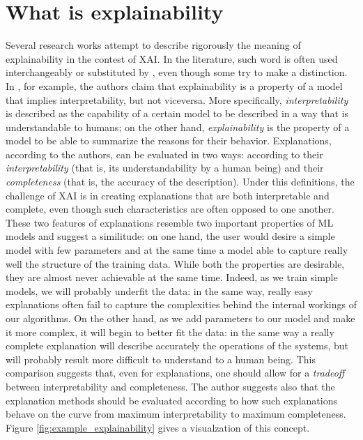 \section{What is explainability}
Several research works attempt to describe rigorously the meaning of explainability in the contest of XAI. In the literature, such word is often used interchangeably or substituted by , even though some try to make a distinction. In \cite{gilpin2018explaining}, for example, the authors claim that explainability is a property of a model that implies interpretability, but not viceversa. More specifically, \textit{interpretability} is described as the capability of a certain model to be described in a  way that is understandable to humans; on the other hand, \textit{explainability} is the property of a model to be able to summarize the reasons for their behavior. Explanations, according to the authors, can be evaluated in two ways: according to their \textit{interpretability} (that is, its understandability by a human being) and their \textit{completeness} (that is, the accuracy of the description). Under this definitions, the challenge of XAI is in creating explanations that are both interpretable and complete, even though such characteristics are often opposed to one another. These two features of explanations resemble two important properties of ML models and suggest a similitude: on one hand, the user would desire a simple model with few parameters and at the same time a model able to capture really well the structure of the training data. While both the properties are desirable, they are almost never achievable at the same time. Indeed, as we train simple models, we will probably underfit the data: in the same way, really easy explanations often fail to capture the complexities behind the internal workings of our algorithms. On the other hand, as we add parameters to our model and make it more complex, it will begin to better fit the data: in the same way a really complete explanation will describe accurately the operations of the systems, but will probably result more difficult to understand to a human being. This comparison suggests that, even for explanations, one should allow for a \textit{tradeoff} between interpretability and completeness. The author suggests also that the explanation methods should be evaluated according to how such explanations behave on the curve from maximum interpretability to maximum completeness. Figure \ref{fig:example_explainability} gives a visualzation of this concept.

